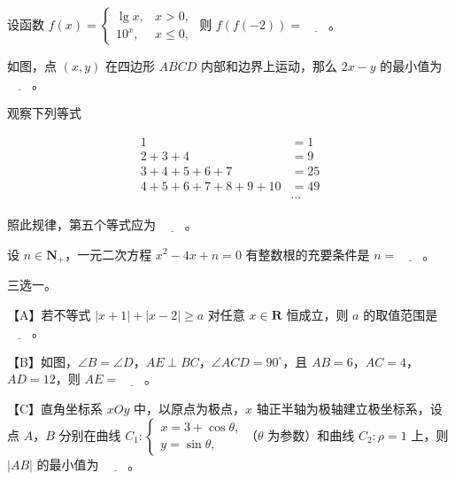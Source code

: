 \begin{question}
设函数 $f(x)=\begin{cases}\lg x,&x>0,\\10^x,&x\leqslant0,\end{cases}$ 则 $f(f(-2))=\underline{\qquad}$。

\Needspace{0.4\textheight}
\end{question}
\begin{question}
如图，点 $(x,y)$ 在四边形 $ABCD$ 内部和边界上运动，那么 $2x-y$ 的最小值为 $\underline{\qquad}$。
\nopagebreak[4]
\begin{center}\end{center}
\nopagebreak[4]
\end{question}
\begin{question}
观察下列等式

\nopagebreak[4]
\[\begin{aligned}
1&=1\\
2+3+4&=9\\
3+4+5+6+7&=25\\
4+5+6+7+8+9+10&=49\\
&\cdots
\end{aligned}\]

照此规律，第五个等式应为 $\underline{\qquad}$。

\end{question}
\begin{question}
设 $n\in\mathbf N_+$，一元二次方程 $x^2-4x+n=0$ 有整数根的充要条件是 $n=\underline{\qquad}$。

\Needspace{0.4\textheight}
\end{question}
\begin{question}
三选一。

【A】若不等式 $|x+1|+|x-2|\geqslant a$ 对任意 $x\in\mathbf R$ 恒成立，则 $a$ 的取值范围是 $\underline{\qquad}$。

【B】如图，$\angle B=\angle D$，$AE\perp BC$，$\angle ACD=90^\circ$，且 $AB=6$，$AC=4$，$AD=12$，则 $AE=\underline{\qquad}$。
\nopagebreak[4]
\begin{center}\end{center}
\nopagebreak[4]
【C】直角坐标系 $xOy$ 中，以原点为极点，$x$ 轴正半轴为极轴建立极坐标系，设点 $A$，$B$ 分别在曲线 $C_1:\begin{cases}x=3+\cos\theta,\\y=\sin\theta,\end{cases}$（$\theta$ 为参数）和曲线 $C_2:\rho=1$ 上，则 $|AB|$ 的最小值为 $\underline{\qquad}$。

\end{question}

